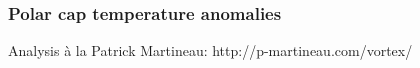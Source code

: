\subsubsection{Polar cap temperature anomalies}
Analysis à la Patrick Martineau: http://p-martineau.com/vortex/
